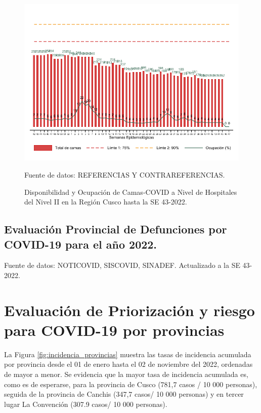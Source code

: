 \documentclass[12pt,a4paper,openany]{book}
\begin{document}
	\begin{figure}[h]
		\caption{Disponibilidad y Ocupación de Camas-COVID a Nivel de Hospitales del Nivel II en la Región Cusco hasta la SE 43-2022.}\label{fig:ocupacion_2nivel}
		\begin{center}
			\includegraphics[width=0.95\linewidth]{../figuras/nivel_2.pdf}
		\end{center}
		{\footnotesize {Fuente de datos: REFERENCIAS Y CONTRAREFERENCIAS.}}
	\end{figure}
	\clearpage
	\begin{landscape}
		
		\subsection*{Evaluación Provincial de Defunciones por COVID-19 para el año 2022.} 
		
		
		
		
		{\footnotesize Fuente de datos: NOTICOVID, SISCOVID, SINADEF. Actualizado a la SE 43-2022.}
		
		\noindent 
		
	\end{landscape}
	
	
	\clearpage
	
	\section*{Evaluación de Priorización y riesgo para COVID-19 por provincias}
	\noindent La Figura \ref{fig:incidencia_provincias} muestra las tasas de incidencia acumulada por provincia desde el 01 de enero hasta el 02 de noviembre del 2022, ordenadas de mayor a menor. Se evidencia que la mayor tasa de incidencia acumulada es, como es de esperarse, para la provincia de Cusco (781,7 casos / 10 000 personas), seguida de la provincia de Canchis (347,7 casos/ 10 000 personas) y en tercer lugar La Convención (307.9 casos/ 10 000 personas).
	
\end{document}
